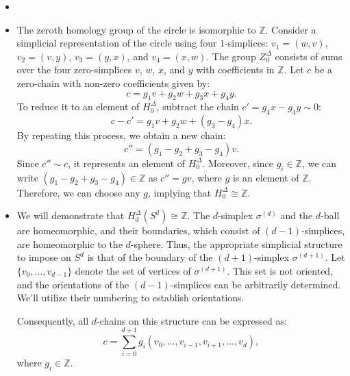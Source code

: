 \begin{example}
	\begin{itemize}
		\item[]

		\item The zeroth homology group of the circle is isomorphic to $\mathbb{Z}$.
			Consider a simplicial representation of the circle using four $1$-simplices:
			$v_{1} = (w, v)$, $v_{2} = (v, y)$, $v_{3} = (y, x)$, and $v_{4} = (x, w)$.
			The group $Z^{\Delta}_{0}$ consists of sums over the four zero-simplices $v$,
			$w$, $x$, and $y$ with coefficients in $\mathbb{Z}$. Let $c$ be a zero-chain
			with non-zero coefficients given by:
			\[
				c = g_{1} v + g_{2} w + g_{3} x + g_{4} y.
			\]
			To reduce it to an element of $H^{\Delta}_{0}$, subtract the chain $c' = g_{4}
			x - g_{4} y \sim 0$:
			\[
				c - c' = g_{1} v + g_{2} w + (g_{3} - g_{4}) x.
			\]
			By repeating this process, we obtain a new chain:
			\[
				c'' = (g_{1} - g_{2} + g_{3} - g_{4}) v.
			\]
			Since $c'' \sim c$, it represents an element of $H^{\Delta}_{0}$. Moreover,
			since $g_{i} \in \mathbb{Z}$, we can write
			$(g_{1} - g_{2} + g_{3} - g_{4}) \in \mathbb{Z}$ as $c'' = g v$, where $g$
			is an element of $\mathbb{Z}$. Therefore, we can choose any $g$, implying
			that $H^{\Delta}_{0} \cong \mathbb{Z}$.

		\item We will demonstrate that $H^{\Delta}_{d}(S^{d}) \cong \mathbb{Z}$. The
			$d$-simplex $\sigma^{(d)}$ and the $d$-ball are homeomorphic, and their boundaries,
			which consist of $(d-1)$-simplices, are homeomorphic to the $d$-sphere.
			Thus, the appropriate simplicial structure to impose on $S^{d}$ is that of
			the boundary of the $(d+1)$-simplex $\sigma^{(d+1)}$. Let
			$\{v_{0}, \ldots, v_{d-1}\}$ denote the set of vertices of
			$\sigma^{(d+1)}$. This set is not oriented, and the orientations of the
			$(d-1)$-simplices can be arbitrarily determined. We'll utilize their numbering
			to establish orientations.

			Consequently, all $d$-chains on this structure can be expressed as:
			\begin{equation}
				\label{chain}c = \sum_{i=0}^{d+1}g_{i} (v_{0}, \ldots, v_{i-1}, v_{i+1},
				\ldots, v_{d}),
			\end{equation}
			where $g_{i} \in \mathbb{Z}$.


\end{itemize}
\end{example}
